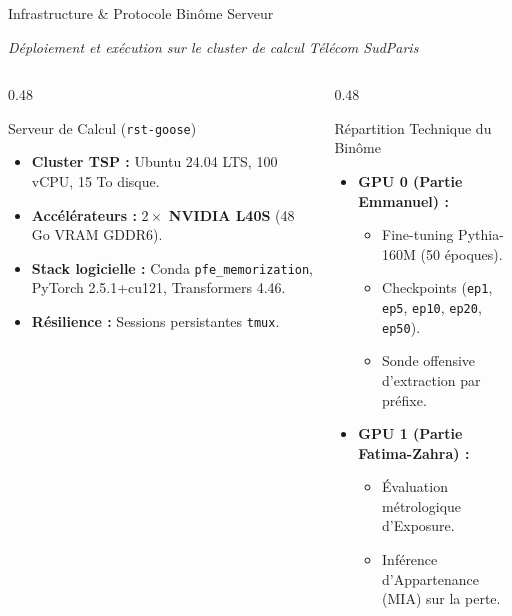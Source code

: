\documentclass[aspectratio=169, 10pt, table]{beamer}
\newcommand{\subtitleline}[1]{{\small\itshape\color{TSPcyan}#1\par}\vspace{0.15cm}}
\begin{document}
\begin{frame}{Infrastructure \& Protocole Binôme Serveur}
    \subtitleline{Déploiement et exécution sur le cluster de calcul Télécom SudParis}
    \begin{columns}[T]
        \begin{column}{0.48\textwidth}
            \begin{block}{Serveur de Calcul (\texttt{rst-goose})}
                \small
                \begin{itemize}
                    \item \textbf{Cluster TSP :} Ubuntu 24.04 LTS, 100 vCPU, 15 To disque.
                    \item \textbf{Accélérateurs :} $2 \times$ \textbf{NVIDIA L40S} (48 Go VRAM GDDR6).
                    \item \textbf{Stack logicielle :} Conda \texttt{pfe\_memorization}, PyTorch 2.5.1+cu121, Transformers 4.46.
                    \item \textbf{Résilience :} Sessions persistantes \texttt{tmux}.
                \end{itemize}
            \end{block}
        \end{column}
        \begin{column}{0.48\textwidth}
            \begin{block}{Répartition Technique du Binôme}
                \small
                \begin{itemize}
                    \item \textbf{GPU 0 (Partie Emmanuel) :}
                    \begin{itemize}
                        \footnotesize
                        \item Fine-tuning Pythia-160M (50 époques).
                        \item Checkpoints (\texttt{ep1}, \texttt{ep5}, \texttt{ep10}, \texttt{ep20}, \texttt{ep50}).
                        \item Sonde offensive d'extraction par préfixe.
                    \end{itemize}
                    \item \textbf{GPU 1 (Partie Fatima-Zahra) :}
                    \begin{itemize}
                        \footnotesize
                        \item Évaluation métrologique d'Exposure.
                        \item Inférence d'Appartenance (MIA) sur la perte.
                    \end{itemize}
                \end{itemize}
            \end{block}
        \end{column}
    \end{columns}
\end{frame}
\end{document}
